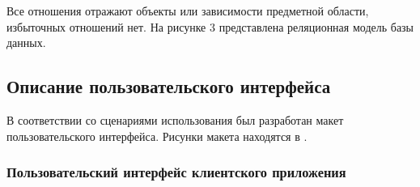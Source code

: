 \tab
Все отношения отражают объекты или зависимости предметной области, избыточных отношений нет.
На рисунке 3 представлена реляционная модель базы данных.
\picturethree

\subsection{Описание пользовательского интерфейса}

\tab
В соответствии со сценариями использования был разработан макет пользовательского интерфейса. Рисунки макета находятся в .

\subsubsection{Пользовательский интерфейс клиентского приложения}


